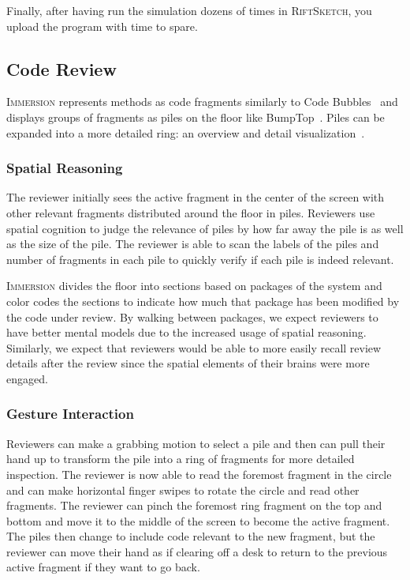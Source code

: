 \documentclass[conference]{IEEEtran}
\begin{document}
Finally, after having run the simulation dozens of times in \textsc{RiftSketch}, you upload the program with time to spare. 



\subsection{Code Review}

\textsc{Immersion} represents methods as code fragments similarly to Code Bubbles~\cite{Bragdon:CodeBubbles} and displays groups of fragments as piles on the floor like BumpTop~\cite{Agarawala:BumpTop}.
Piles can be expanded into a more detailed ring: an overview and detail visualization~\cite{Shneiderman:InfoVisTaxonomy}.


\subsubsection{Spatial Reasoning}

The reviewer initially sees the active fragment in the center of the screen with other relevant fragments distributed around the floor in piles. 
Reviewers use spatial cognition to judge the relevance of piles by how far away the pile is as well as the size of the pile.
The reviewer is able to scan the labels of the piles and number of fragments in each pile to quickly verify if each pile is indeed relevant.

\textsc{Immersion} divides the floor into sections based on packages of the system and color codes the sections to indicate how much that package has been modified by the code under review.
By walking between packages, we expect reviewers to have better mental models due to the increased usage of spatial reasoning.
Similarly, we expect that reviewers would be able to more easily recall review details after the review since the spatial elements of their brains were more engaged.


\subsubsection{Gesture Interaction}

Reviewers can make a grabbing motion to select a pile and then can pull their hand up to transform the pile into a ring of fragments for more detailed inspection.
The reviewer is now able to read the foremost fragment in the circle and can make horizontal finger swipes to rotate the circle and read other fragments. 
The reviewer can pinch the foremost ring fragment on the top and bottom and move it to the middle of the screen to become the active fragment.
The piles then change to include code relevant to the new fragment, but the reviewer can move their hand as if clearing off a desk to return to the previous active fragment if they want to go back.
\end{document}
